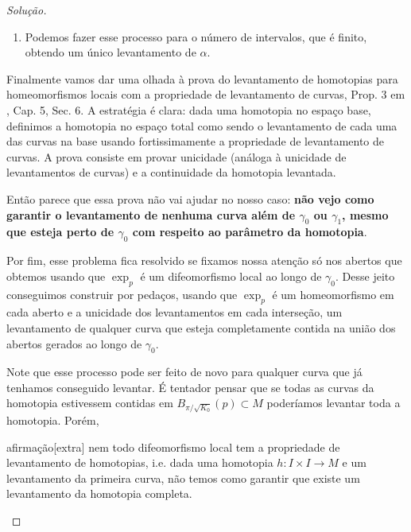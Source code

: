 \begin{proof}[Solução]
\begin{enumerate}[label=(\alph*)]
	No caso de \(\operatorname{exp}_p\), embora podemos garantir que existe um aberto onde \(\operatorname{exp}_p\) se restringe a um homeomorfismo, não temos como garantir que essa vizinhança intersecta vizinhança onde começou o levantamento. 

Continuando com a construção, como \( \pi\) se restringe a um homeomorfismo em \(V_1\) podemos definir um levantamento novamente como a imagem inversa sob \(\pi\).

Como já provamos unicidade e \textbf{os levantamentos coincidem num ponto}, o segundo levantamento coincide com o primeiro na interseção \(I_0 \cap I_1\).
\item Podemos fazer esse processo para o número de intervalos, que é finito, obtendo um único levantamento de \(\alpha\).
\end{enumerate}

Finalmente vamos dar uma olhada à prova do levantamento de homotopias para homeomorfismos locais com a propriedade de levantamento de curvas, Prop. 3 em \cite{docsu}, Cap. 5, Sec. 6. A estratégia é clara: dada uma homotopia no espaço base, definimos a homotopia no espaço total como sendo o levantamento de cada uma das curvas na base usando fortissimamente a propriedade de levantamento de curvas. A prova consiste em provar unicidade (análoga à unicidade de levantamentos de curvas) e a continuidade da homotopia levantada.

Então parece que essa prova não vai ajudar no nosso caso: \textbf{não vejo como garantir o levantamento de nenhuma curva além de \(\gamma_0\) ou \(\gamma_1\), mesmo que esteja perto de \(\gamma_0\) com respeito ao parâmetro da homotopia}.

Por fim, esse problema fica resolvido se fixamos nossa atenção só nos abertos que obtemos usando que \(\operatorname{exp}_p\) é um difeomorfismo local ao longo de \(\gamma_0\). Desse jeito conseguimos construir por pedaços, usando que \(\operatorname{exp}_p\) é um homeomorfismo em cada aberto e a unicidade dos levantamentos em cada interseção, um levantamento de qualquer curva que esteja completamente contida na união dos abertos gerados ao longo de \(\gamma_0\).

Note que esse processo pode ser feito de novo para qualquer curva que já tenhamos conseguido levantar. É tentador pensar que se todas as curvas da homotopia estivessem contidas em \(B_{\pi/\sqrt{K_0}}(p) \subset M\) poderíamos levantar toda a homotopia. Porém,

\begin{thing7}{afirmação}[extra]\leavevmode
nem todo difeomorfismo local tem a propriedade de levantamento de homotopias, i.e. dada uma homotopia \(h:I \times I \to M\) e um levantamento da primeira curva, não temos como garantir que existe um levantamento da homotopia completa.
\end{thing7}


\end{proof}
